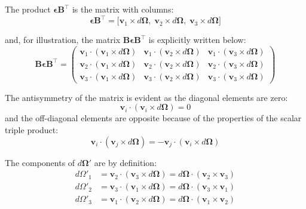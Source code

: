 \documentclass[12pt]{article}
\begin{document}
The product $\boldsymbol{\epsilon}\mathbf{B}^\top$ is the matrix with columns:
\begin{equation}
  \boldsymbol{\epsilon}\mathbf{B}^\top =
  \bigl[\mathbf{v}_1 \times d\boldsymbol{\Omega},\;
        \mathbf{v}_2 \times d\boldsymbol{\Omega},\;
        \mathbf{v}_3 \times d\boldsymbol{\Omega}\bigr]
\end{equation}

and, for illustration, the matrix $\mathbf{B}\boldsymbol{\epsilon}\mathbf{B}^\top$ is
explicitly written below:
\begin{equation}
  \mathbf{B}\boldsymbol{\epsilon}\mathbf{B}^\top =
  \begin{pmatrix}
    \mathbf{v}_1\cdot(\mathbf{v}_1\times d\boldsymbol{\Omega}) &
    \mathbf{v}_1\cdot(\mathbf{v}_2\times d\boldsymbol{\Omega}) &
    \mathbf{v}_1\cdot(\mathbf{v}_3\times d\boldsymbol{\Omega}) \\
    \mathbf{v}_2\cdot(\mathbf{v}_1\times d\boldsymbol{\Omega}) &
    \mathbf{v}_2\cdot(\mathbf{v}_2\times d\boldsymbol{\Omega}) &
    \mathbf{v}_2\cdot(\mathbf{v}_3\times d\boldsymbol{\Omega}) \\
    \mathbf{v}_3\cdot(\mathbf{v}_1\times d\boldsymbol{\Omega}) &
    \mathbf{v}_3\cdot(\mathbf{v}_2\times d\boldsymbol{\Omega}) &
    \mathbf{v}_3\cdot(\mathbf{v}_3\times d\boldsymbol{\Omega})
  \end{pmatrix}
\end{equation}

The antisymmetry of the matrix is evident as the diagonal elements are zero:
\begin{equation}
  \mathbf{v}_i\cdot(\mathbf{v}_i\times d\boldsymbol{\Omega}) = 0
\end{equation}
and the off-diagonal elements are opposite because of the properties of the scalar triple
product:
\begin{equation}
  \mathbf{v}_i\cdot(\mathbf{v}_j\times d\boldsymbol{\Omega}) =
  -\mathbf{v}_j\cdot(\mathbf{v}_i\times d\boldsymbol{\Omega})
\end{equation}

The components of $d\boldsymbol{\Omega}'$ are by definition:
\begin{align}
  d\Omega'_1 &= \mathbf{v}_2\cdot(\mathbf{v}_3\times d\boldsymbol{\Omega})
              = d\boldsymbol{\Omega}\cdot(\mathbf{v}_2\times\mathbf{v}_3) \\
  d\Omega'_2 &= \mathbf{v}_3\cdot(\mathbf{v}_1\times d\boldsymbol{\Omega})
              = d\boldsymbol{\Omega}\cdot(\mathbf{v}_3\times\mathbf{v}_1) \\
  d\Omega'_3 &= \mathbf{v}_1\cdot(\mathbf{v}_2\times d\boldsymbol{\Omega})
              = d\boldsymbol{\Omega}\cdot(\mathbf{v}_1\times\mathbf{v}_2)
\end{align}
\end{document}
